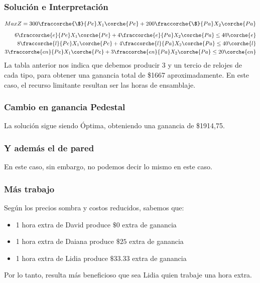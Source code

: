 
\subsubsection{Solución e Interpretación}
\begin{align*}
    Max Z = 300\fraccorche{\$}{Pe}X_1\corche{Pe} + 200\fraccorche{\$}{Pa}X_2\corche{Pa} \\
\end{align*}
\begin{align*}
    6\fraccorche{e}{Pe}X_1\corche{Pe} + 4\fraccorche{e}{Pa}X_2\corche{Pa} \le 40\corche{e} \\
    8\fraccorche{l}{Pe}X_1\corche{Pe} + 4\fraccorche{l}{Pa}X_2\corche{Pa} \le 40\corche{l} \\
    3\fraccorche{en}{Pe}X_1\corche{Pe} + 3\fraccorche{en}{Pa}X_2\corche{Pa} \le 20\corche{en} \\
\end{align*}
La tabla anterior nos indica que debemos producir 3 y un tercio de relojes de cada tipo, para obtener una ganancia total de \$1667 aproximadamente. En este caso, el recurso limitante resultan ser las horas de ensamblaje.

\subsubsection{Cambio en ganancia Pedestal}
La solución sigue siendo Óptima, obteniendo una ganancia de \$1914,75. \\
\subsubsection{Y además el de pared}
En este caso, sin embargo, no podemos decir lo mismo en este caso.
\subsubsection{Más trabajo}
Según los precios sombra y costos reducidos, sabemos que:
\begin{itemize}
    \item 1 hora extra de David produce $\$0$ extra de ganancia
    \item 1 hora extra de Daiana produce $\$25$ extra de ganancia
    \item 1 hora extra de Lidia produce $\$33.33$ extra de ganancia
\end{itemize}
Por lo tanto, resulta más beneficioso que sea Lidia quien trabaje una hora extra.

